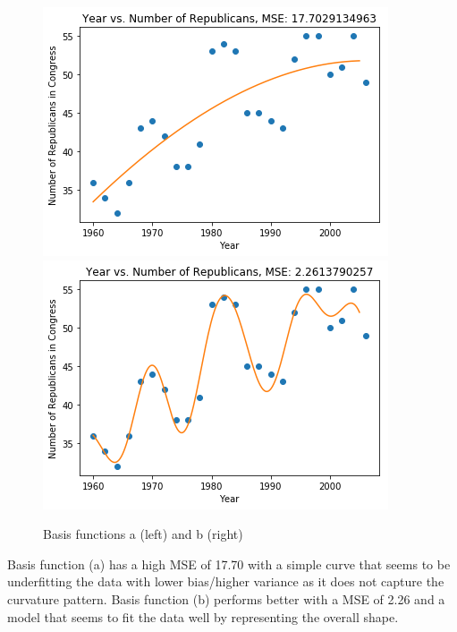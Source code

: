 \documentclass[submit]{harvardml}
\begin{document}
\begin{figure}[!htbp]
\begin{center}
    \includegraphics[scale=.55]{11.png}
    \includegraphics[scale=.55]{12.png}
    \caption{Basis functions a (left) and b (right)}
\end{center}
\end{figure}

Basis function (a) has a high MSE of 17.70 with a simple curve that seems to be underfitting the data with lower bias/higher variance as it does not capture the curvature pattern. Basis function (b) performs better with a MSE of 2.26 and a model that seems to fit the data well by representing the overall shape. 
\end{document}
